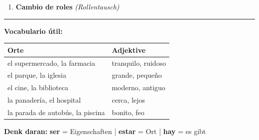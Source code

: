 \documentclass[11pt, a4paper]{article}
\begin{document}
\begin{center}
{\begin{minipage}{0.95\textwidth}
\begin{enumerate}[label=\textbf{\arabic*.}, leftmargin=2em, itemsep=0.5em]
    \vspace{0.3cm}

    \item {\large\bfseries Cambio de roles} \textit{(Rollentausch)}
\end{enumerate}

\vspace{0.5cm}
\hrule
\vspace{0.5cm}

{\Large\bfseries Vocabulario útil:}

\vspace{0.3cm}

\begin{tabularx}{\textwidth}{@{}|X|X|@{}}
\hline
\rowcolor{gruppeA!10}
\textbf{Orte} & \textbf{Adjektive} \\
\hline
el supermercado, la farmacia & tranquilo, ruidoso \\
el parque, la iglesia & grande, pequeño \\
el cine, la biblioteca & moderno, antiguo \\
la panadería, el hospital & cerca, lejos \\
la parada de autobús, la piscina & bonito, feo \\
\hline
\end{tabularx}

\vspace{0.5cm}

\begin{center}
\colorbox{gruppeA!20}{\parbox{0.9\textwidth}{\centering
\textbf{Denk daran:} \textbf{ser} = Eigenschaften | \textbf{estar} = Ort | \textbf{hay} = es gibt
}}
\end{center}

\vspace{0.3cm}
\end{minipage}%
}
\end{center}

\newpage


\begin{center}
\end{center}
\end{document}
